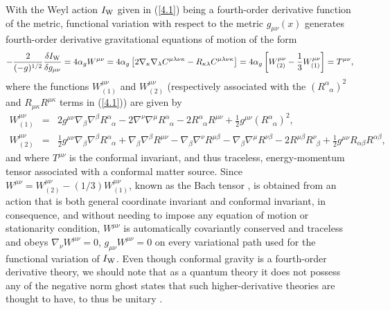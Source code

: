 \documentclass[aps,onecolumn,10pt]{revtex4}
\numberwithin{equation}{section}
\numberwithin{equation}{section}
\begin{document}
With the Weyl action $I_{\rm W}$ given in  (\ref{4.1}) being a fourth-order derivative function of the metric, functional variation with respect to the metric $g_{\mu\nu}(x)$ generates fourth-order derivative gravitational equations of motion of the form \cite{Mannheim2006} 
%
\begin{eqnarray}
-\frac{2}{(-g)^{1/2}}\frac{\delta I_{\rm W}}{\delta g_{\mu\nu}}=4\alpha_g W^{\mu\nu}=4\alpha_g\left[2\nabla_{\kappa}\nabla_{\lambda}C^{\mu\lambda\nu\kappa}-
R_{\kappa\lambda}C^{\mu\lambda\nu\kappa}\right]=4\alpha_g\left[W^{\mu
\nu}_{(2)}-\frac{1}{3}W^{\mu\nu}_{(1)}\right]=T^{\mu\nu},
\label{4.3}
\end{eqnarray}
% 
where the functions $W^{\mu \nu}_{(1)}$ and $W^{\mu \nu}_{(2)}$ (respectively associated with the $(R^{\alpha}_{\phantom{\alpha}\alpha})^2$ and $R_{\mu\kappa}R^{\mu\kappa}$ terms in (\ref{4.1})) are given by
%                                                                               
\begin{eqnarray}
W^{\mu \nu}_{(1)}&=&
2g^{\mu\nu}\nabla_{\beta}\nabla^{\beta}R^{\alpha}_{\phantom{\alpha}\alpha}                                             
-2\nabla^{\nu}\nabla^{\mu}R^{\alpha}_{\phantom{\alpha}\alpha}                          
-2 R^{\alpha}_{\phantom{\alpha}\alpha}R^{\mu\nu}                              
+\frac{1}{2}g^{\mu\nu}(R^{\alpha}_{\phantom{\alpha}\alpha})^2,
\nonumber\\
W^{\mu \nu}_{(2)}&=&
\frac{1}{2}g^{\mu\nu}\nabla_{\beta}\nabla^{\beta}R^{\alpha}_{\phantom{\alpha}\alpha}
+\nabla_{\beta}\nabla^{\beta}R^{\mu\nu}                    
 -\nabla_{\beta}\nabla^{\nu}R^{\mu\beta}                       
-\nabla_{\beta}\nabla^{\mu}R^{\nu \beta}                          
 - 2R^{\mu\beta}R^{\nu}_{\phantom{\nu}\beta}                                    
+\frac{1}{2}g^{\mu\nu}R_{\alpha\beta}R^{\alpha\beta},
\label{4.4}
\end{eqnarray}                                 
%
and where $T^{\mu\nu}$ is the conformal invariant, and thus traceless, energy-momentum tensor associated with a conformal matter source.  Since $W^{\mu\nu}=W^{\mu
\nu}_{(2)}-(1/3)W^{\mu\nu}_{(1)}$, known as the Bach tensor \cite{Bach1921},  is obtained from an action that is both general coordinate invariant and conformal invariant, in consequence, and without needing to impose any equation of motion or stationarity condition, $W^{\mu\nu}$ is automatically covariantly conserved and traceless and obeys $\nabla_{\nu}W^{\mu\nu}=0$, $g_{\mu\nu}W^{\mu\nu}=0$ on every variational path used for the functional variation of $I_{\rm W}$. Even though conformal gravity is a fourth-order derivative theory, we should note that as a quantum theory  it does not possess any of the negative norm ghost states that such higher-derivative theories are thought to have, to thus be unitary  \cite{Bender2008}. 
\end{document}
